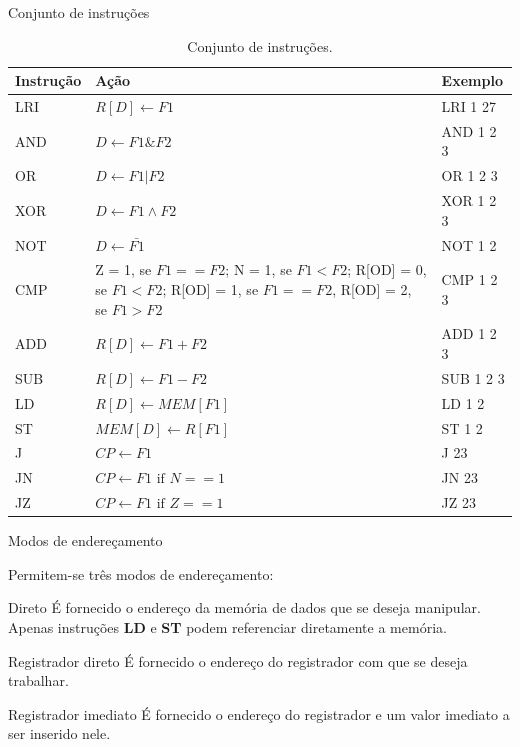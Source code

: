 \documentclass{beamer}
\begin{document}
		\begin{frame}{Conjunto de instruções}

			\begin{table}[H]
			\footnotesize
			\centering
			\begin{tabular}{l | p{6cm} | l}
			Instrução & Ação & Exemplo\\
				\hline
			    LRI & $R[D] \leftarrow F1$ & LRI 1 27\\
			    AND & $D \leftarrow F1 \& F2$ & AND 1 2 3\\
			    OR  & $D \leftarrow F1 | F2$ & OR 1 2 3\\
			    XOR & $D \leftarrow F1 \wedge F2$ & XOR 1 2 3\\
			    NOT & $D \leftarrow \bar{F1}$ & NOT 1 2\\
			    CMP & Z = 1, se $F1==F2$; N = 1, se $F1 < F2$; R[OD] = 0, se $F1 < F2$; R[OD] = 1, se $F1 == F2$, R[OD] = 2, se $F1 > F2$ & CMP 1 2 3\\
			    ADD & $R[D] \leftarrow F1 + F2$ & ADD 1 2 3\\
			    SUB & $R[D] \leftarrow F1 - F2$ & SUB 1 2 3\\
			    LD  & $R[D] \leftarrow MEM[F1]$ & LD 1 2\\
			    ST  & $MEM[D] \leftarrow R[F1]$ & ST 1 2\\
			    J   & $CP \leftarrow F1$ & J 23\\
			    JN  & $CP \leftarrow F1 \text{ if } N == 1$ & JN 23\\
			    JZ  & $CP \leftarrow F1 \text{ if } Z == 1$ & JZ 23\\
			\end{tabular}
			\label{tab:inst}
			\caption{Conjunto de instruções.}
			\end{table}
		\end{frame}

		\begin{frame}{Modos de endereçamento}

			Permitem-se três modos de endereçamento:

			\begin{block}{Direto}
			    É fornecido o endereço da memória de dados
			    que se deseja manipular. Apenas instruções \textbf{LD} e \textbf{ST} podem referenciar diretamente a memória.
			\end{block}

			\begin{block}{Registrador direto}
			    É fornecido o endereço do
			    registrador com que se deseja trabalhar.
			\end{block}

			\begin{block}{Registrador imediato}
			    É fornecido o endereço
			    do registrador e um valor imediato a ser inserido
			    nele.
			\end{block}

		\end{frame}
		
\end{document}
